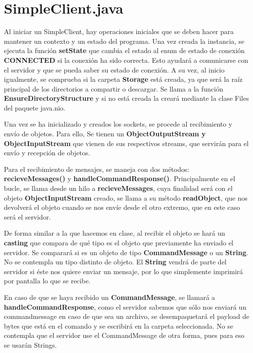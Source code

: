 \documentclass[a4paper, 12pt]{report}
\begin{document}
\section{SimpleClient.java}

Al iniciar un SimpleClient, hay operaciones iniciales que se deben hacer para mantener un contexto y un estado del programa. Una vez creada la instancia, se ejecuta la función \textbf{setState} que cambia el estado al enum de estado de conexión \textbf{CONNECTED} si la conexión ha sido correcta. Esto ayudará a comunicarse con el servidor y que se pueda saber su estado de conexión.
A su vez, al inicio igualmente, se comprueba si la carpeta \textbf{Storage} está creada, ya que será la raíz principal de los directorios a compartir o descargar. Se llama a la función \textbf{EnsureDirectoryStructure} y si no está creada la creará mediante la clase Files del paquete java.nio.

Una vez se ha inicializado y creados los sockets, se procede al recibimiento y envío de objetos. Para ello, Se tienen un \textbf{ObjectOutputStream y ObjectInputStream} que vienen de sus respectivos streams, que servirán para el envío y recepción de objetos.

Para el recibimiento de mensajes, se maneja con dos métodos: \textbf{recieveMessages()} y \textbf{handleCommandResponse()}. Principalmente en el bucle, se llama desde un hilo a \textbf{recieveMessages}, cuya finalidad será con el objeto \textbf{ObjectInputStream} creado, se llama a su método \textbf{readObject}, que nos devolverá el objeto cuando se nos envíe desde el otro extremo, que en este caso será el servidor.

De forma similar a la que hacemos en clase, al recibir el objeto se hará un \textbf{casting} que compara de qué tipo es el objeto que previamente ha enviado el servidor. Se comparará si es un objeto de tipo \textbf{CommandMessage} o un \textbf{String}. No se contempla un tipo distinto de objeto. El \textbf{String} vendrá de parte del servidor si éste nos quiere enviar un mensaje, por lo que simplemente imprimirá por pantalla lo que se recibe.

En caso de que se haya recibido un \textbf{CommandMessage}, se llamará a \textbf{handleCommandResponse}, como el servidor sabemos que sólo nos enviará un commandmessage en caso de que sea un archivo, se desempaquetará el payload de bytes que está en el comando y se escribirá en la carpeta seleccionada. No se contempla que el servidor use el CommandMessage de otra forma, pues para eso se usarán Strings.
\end{document}
